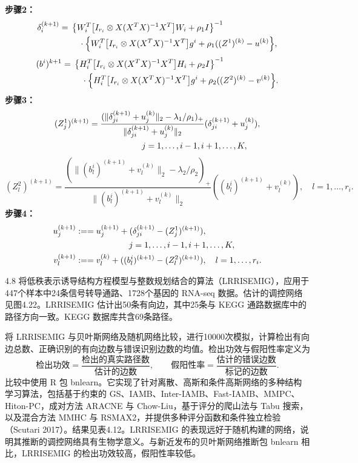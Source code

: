\noindent\textbf{步骤2：}
\[
\begin{aligned}
\delta_i^{(k+1)}={}&\left\{W_i^T\bigl[I_{r_i}\otimes X(X^TX)^{-1}X^T\bigr] W_i+\rho_1I\right\}^{-1}\\
&\quad\cdot\Bigl\{W_i^T\bigl[I_{r_i}\otimes X(X^TX)^{-1}X^T\bigr] g^i+\rho_1((Z^1)^{(k)}-u^{(k)}\Bigr\},
\end{aligned}
\]
\[
\begin{aligned}
(b^i)^{k+1}={}&\left\{H_i^T\bigl[I_{r_i}\otimes X(X^TX)^{-1}X^T\bigr] H_i+\rho_2I\right\}^{-1}\\
&\quad\cdot\Bigl\{H_i^T\bigl[I_{r_i}\otimes X(X^TX)^{-1}X^T\bigr] g^i+\rho_2((Z^2)^{(k)}-v^{(k)}\Bigr\}.
\end{aligned}
\]
\noindent\textbf{步骤3：}
\[
\begin{aligned}
(Z_j^1)^{(k+1)}&=\frac{(\lVert\delta_{ji}^{(k+1)}+u_j^{(k)}\rVert_2-\lambda_1/\rho_1)_+}
{\lVert\delta_{ji}^{(k+1)}+u_j^{(k)}\rVert_2}
(\delta_{ji}^{(k+1)}+u_j^{(k)}),\\
&\hspace{22mm}j=1,\ldots,i-1,i+1,\ldots,K,
\end{aligned}
\]
\[
(Z_l^2)^{(k+1)}=\frac{(\lVert(b_l^i)^{(k+1)}+v_l^{(k)}\rVert_2-\lambda_2/\rho_2)_+}
{\lVert(b_l^i)^{(k+1)}+v_l^{(k)}\rVert_2}
((b_l^i)^{(k+1)}+v_l^{(k)}),\quad l=1,\ldots,r_i.
\]
\noindent\textbf{步骤4：}
\[
\begin{aligned}
u_j^{(k+1)}&\mathrel{:==}u_j^{(k+1)}+(\delta_{ji}^{(k+1)}-(Z_j^1)^{(k+1)}),\\
&\hspace{22mm}j=1,\ldots,i-1,i+1,\ldots,K,\\
v_l^{(k+1)}&\mathrel{:==}v_l^{(k)}+((b_l^i)^{(k+1)}-(Z_l^2)^{(k+1)}),\quad l=1,\ldots,r_i.
\end{aligned}
\]

\begin{bookexample}{4.8}
将低秩表示诱导结构方程模型与整数规划结合的算法（LRRISEMIG），应用于447个样本中24条信号转导通路、1728个基因的 RNA-seq 数据。估计的调控网络见图4.22。LRRISEMIG 估计出50条有向边，其中25条与 KEGG 通路数据库中的路径方向一致。KEGG 数据库共含69条路径。

将 LRRISEMIG 与贝叶斯网络及随机网络比较，进行10000次模拟，计算检出有向边总数、正确识别的有向边数与错误识别边数的均值。检出功效与假阳性率定义为
\[
\text{检出功效}=\frac{\text{检出的真实路径数}}{\text{估计的边数}},\qquad
\text{假阳性率}=\frac{\text{估计的错误边数}}{\text{标记的边数}}.
\]
比较中使用 R 包 bnlearn。它实现了针对离散、高斯和条件高斯网络的多种结构学习算法，包括基于约束的 GS、IAMB、Inter-IAMB、Fast-IAMB、MMPC、Hiton-PC，成对方法 ARACNE 与 Chow-Liu，基于评分的爬山法与 Tabu 搜索，以及混合方法 MMHC 与 RSMAX2，并提供多种评分函数和条件独立检验（Scutari 2017）。结果见表4.12。LRRISEMIG 的表现远好于随机构建的网络，说明其推断的调控网络具有生物学意义。与新近发布的贝叶斯网络推断包 bnlearn 相比，LRRISEMIG 的检出功效较高，假阳性率较低。
\end{bookexample}


\FloatBarrier

